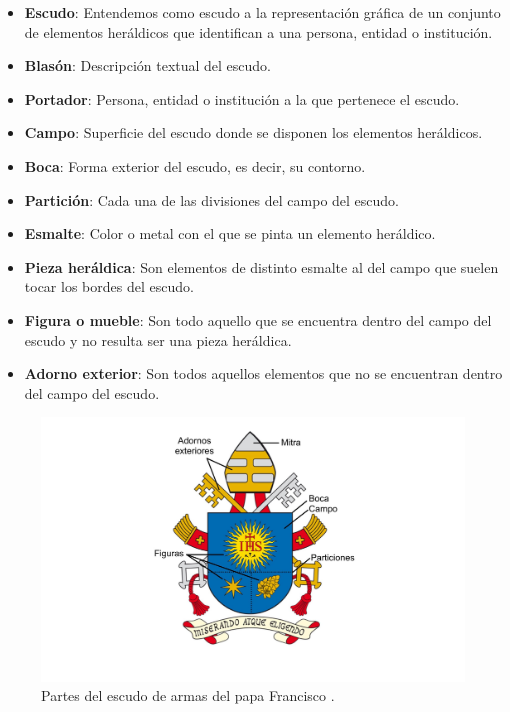 \begin{itemize}
    \item \textbf{Escudo}: Entendemos como escudo a la representación gráfica de un conjunto de
    elementos heráldicos que identifican a una persona, entidad o institución.
    \item \textbf{Blasón}: Descripción textual del escudo.
    \item \textbf{Portador}: Persona, entidad o institución a la que pertenece el escudo.
    \item \textbf{Campo}: Superficie del escudo donde se disponen los elementos heráldicos.
    \item \textbf{Boca}: Forma exterior del escudo, es decir, su contorno.
    \item \textbf{Partición}: Cada una de las divisiones del campo del escudo. 
    \item \textbf{Esmalte}: Color o metal con el que se pinta un elemento heráldico.
    \item \textbf{Pieza heráldica}: Son elementos de distinto esmalte al del campo que suelen tocar
    los bordes del escudo.
    \item \textbf{Figura o mueble}: Son todo aquello que se encuentra dentro del campo del escudo y
    no resulta ser una pieza heráldica.
    \item \textbf{Adorno exterior}: Son todos aquellos elementos que no se encuentran dentro del campo
    del escudo.
\end{itemize}

\begin{figure}[H]
    \centering
    \includegraphics[width=1\textwidth]{figuras/escudo-papa-francisco.png}
    \caption{Partes del escudo de armas del papa Francisco \cite{wikiEscudo}.}
    \label{fig:partes-escudo}
\end{figure}

